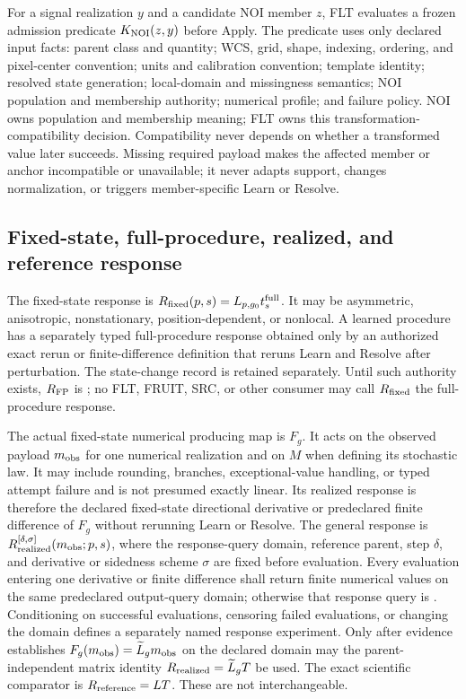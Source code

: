 For a signal realization $y$ and a candidate NOI member $z$, FLT evaluates a
frozen admission predicate $K_{\rm NOI}(z,y)$ before Apply. The predicate uses
only declared input facts: parent class and quantity; WCS, grid, shape,
indexing, ordering, and pixel-center convention; units and calibration
convention; template identity; resolved state generation; local-domain and
missingness semantics; NOI population and membership authority; numerical
profile; and failure policy. NOI owns population and membership meaning; FLT
owns this transformation-compatibility decision. Compatibility never depends
on whether a transformed value later succeeds. Missing required payload makes
the affected member or anchor incompatible or unavailable; it never adapts
support, changes normalization, or triggers member-specific Learn or Resolve.

\subsection{Fixed-state, full-procedure, realized, and reference response}
\label{sec:response-families}

The fixed-state response is
$R_{\rm fixed}(p,s)=L_{p,g_0}t_s^{\rm full}$. It may be asymmetric,
anisotropic, nonstationary, position-dependent, or nonlocal. A learned
procedure has a separately typed full-procedure response obtained only by an
authorized exact rerun or finite-difference definition that reruns Learn and
Resolve after perturbation. The state-change record is retained separately.
Until such authority exists, $R_{\rm FP}$ is \Unavailable{}; no FLT, FRUIT,
SRC, or other consumer may call $R_{\rm fixed}$ the full-procedure response.

The actual fixed-state numerical producing map is $F_g$. It acts on the
observed payload $m_{\rm obs}$ for one numerical realization and on $M$ when
defining its stochastic law. It may include
rounding, branches, exceptional-value handling, or typed attempt failure and is
not presumed exactly linear. Its realized response is therefore the declared
fixed-state directional derivative or predeclared finite difference of $F_g$
without rerunning Learn or Resolve. The general response is
$R_{\rm realized}^{[\delta,\sigma]}(m_{\rm obs};p,s)$, where the response-query domain,
reference parent, step $\delta$, and derivative or sidedness scheme $\sigma$
are fixed before evaluation. Every evaluation entering one derivative or
finite difference shall return finite numerical values on the same
predeclared output-query domain; otherwise that response query is
\Unavailable{}. Conditioning on successful evaluations, censoring failed
evaluations, or changing the domain defines a separately named response
experiment. Only after evidence establishes
$F_g(m_{\rm obs})=\widetilde L_gm_{\rm obs}$ on the
declared domain may the parent-independent matrix identity
$R_{\rm realized}=\widetilde L_gT$ be used. The exact scientific comparator is
$R_{\rm reference}=LT$. These are not interchangeable.

